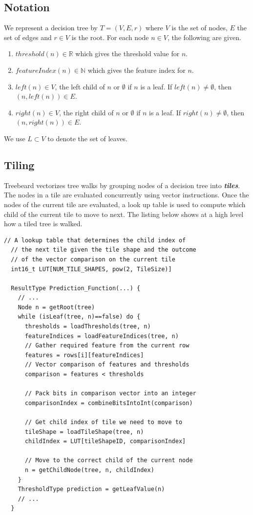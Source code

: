 \subsection{Notation}
We represent a decision tree by $T = (V, E, r)$ where $V$ is the set of nodes, $E$ the set of edges and
$r \in V$ is the root. For each node $n \in V$, the following are given.
\begin{enumerate}
    \item $threshold(n) \in \mathbb{R}$ which gives the threshold value for $n$.
    \item $featureIndex(n) \in \mathbb{N}$ which gives the feature index for $n$.
    \item $left(n) \in V$, the left child of $n$ or $\emptyset$ if $n$ is a leaf. If $left(n) \neq \emptyset$, then $(n, left(n)) \in E$.
    \item $right(n) \in V$, the right child of $n$ or $\emptyset$ if $n$ is a leaf. If $right(n) \neq \emptyset$, then $(n, right(n)) \in E$.
\end{enumerate}
We use $L \subset V$ to denote the set of leaves. 

\subsection{Tiling}

Treebeard vectorizes tree walks by grouping nodes of a decision tree into \textbf{\emph{tiles}}. The nodes in a tile are evaluated concurrently using vector instructions. Once the nodes of the current tile are evaluated, a look up table is used to compute which child of the current tile to move to next. The listing below shows at a high level how a tiled tree is walked. 
\begin{lstlisting}[style=c++]
  // A lookup table that determines the child index of
  // the next tile given the tile shape and the outcome
  // of the vector comparison on the current tile
  int16_t LUT[NUM_TILE_SHAPES, pow(2, TileSize)]
  
  ResultType Prediction_Function(...) {
    // ...
    Node n = getRoot(tree)
    while (isLeaf(tree, n)==false) do {
      thresholds = loadThresholds(tree, n)
      featureIndices = loadFeatureIndices(tree, n)
      // Gather required feature from the current row
      features = rows[i][featureIndices]
      // Vector comparison of features and thresholds
      comparison = features < thresholds
      
      // Pack bits in comparison vector into an integer
      comparisonIndex = combineBitsIntoInt(comparison)
      
      // Get child index of tile we need to move to
      tileShape = loadTileShape(tree, n)
      childIndex = LUT[tileShapeID, comparisonIndex]
      
      // Move to the correct child of the current node
      n = getChildNode(tree, n, childIndex) 
    }
    ThresholdType prediction = getLeafValue(n)
    // ...
  }  
\end{lstlisting}

